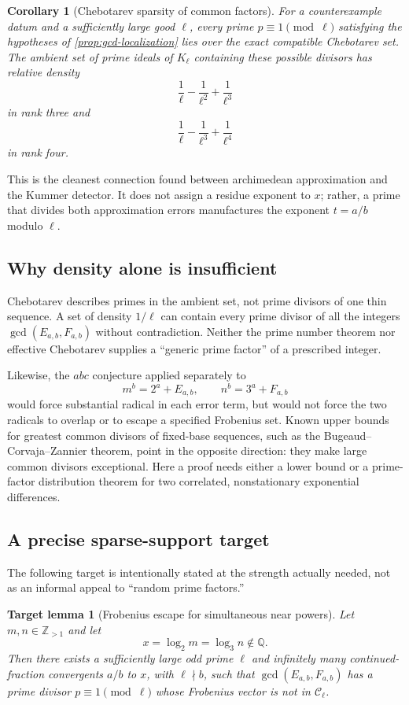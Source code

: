 \documentclass[11pt,oneside]{article}
\newtheorem{corollary}[theorem]{Corollary}
\newtheorem{target}[theorem]{Target lemma}
\theoremstyle{definition}
\theoremstyle{remark}
\newcommand{\Q}{\mathbb{Q}}
\newcommand{\Z}{\mathbb{Z}}
\begin{document}
\begin{corollary}[Chebotarev sparsity of common factors]\label{cor:gcd-sparse}
For a counterexample datum and a sufficiently large good $\ell$, every prime
$p\equiv1\pmod\ell$ satisfying the hypotheses of
\cref{prop:gcd-localization} lies over the exact compatible Chebotarev set.  The ambient set
of prime ideals of $K_\ell$ containing these possible divisors has relative density
\[
 \frac1\ell-\frac1{\ell^2}+\frac1{\ell^3}
\]
in rank three and
\[
 \frac1\ell-\frac1{\ell^3}+\frac1{\ell^4}
\]
in rank four.
\end{corollary}

This is the cleanest connection found between archimedean approximation and
the Kummer detector.  It does not assign a residue exponent to $x$; rather,
a prime that divides both approximation errors manufactures the exponent
$t=a/b$ modulo $\ell$.

\subsection{Why density alone is insufficient}

Chebotarev describes primes in the ambient set, not prime divisors of one
thin sequence.  A set of density $1/\ell$ can contain every prime divisor of
all the integers $\gcd(E_{a,b},F_{a,b})$ without contradiction.  Neither the
prime number theorem nor effective Chebotarev supplies a ``generic prime
factor'' of a prescribed integer.

Likewise, the $abc$ conjecture applied separately to
\[
 m^b=2^a+E_{a,b},\qquad n^b=3^a+F_{a,b}
\]
would force substantial radical in each error term, but would not force the
two radicals to overlap or to escape a specified Frobenius set.  Known upper
bounds for greatest common divisors of fixed-base sequences, such as the
Bugeaud--Corvaja--Zannier theorem, point in the opposite direction: they make
large common divisors exceptional.  Here a proof needs either a lower bound
or a prime-factor distribution theorem for two correlated, nonstationary
exponential differences.

\subsection{A precise sparse-support target}

The following target is intentionally stated at the strength actually needed,
not as an informal appeal to ``random prime factors.''

\begin{target}[Frobenius escape for simultaneous near powers]\label{target:frob-escape}
Let $m,n\in\Z_{>1}$ and let
\[
 x=\log_2 m=\log_3 n\notin\Q.
\]
Then there exists a sufficiently large odd prime $\ell$ and infinitely many
continued-fraction convergents $a/b$ to $x$, with $\ell\nmid b$, such that
$\gcd(E_{a,b},F_{a,b})$ has a prime divisor $p\equiv1\pmod\ell$ whose
Frobenius vector is not in $\mathcal C_\ell$.
\end{target}
\end{document}
